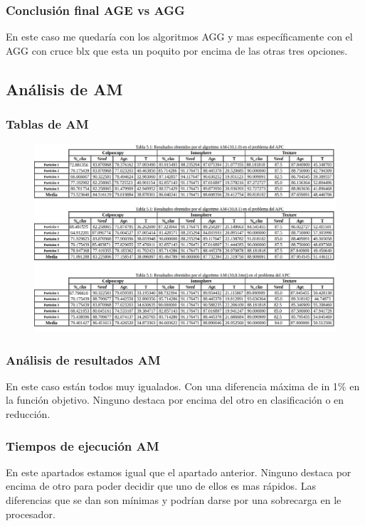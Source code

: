 \documentclass[titlepage]{article}
\begin{document}
	\subsubsection{Conclusión final AGE vs AGG}
	En este caso me quedaría con los algoritmos AGG y mas específicamente con el AGG	con cruce blx que esta un poquito por encima de las otras tres opciones.
	
	
	\subsection{Análisis de AM}
	\subsubsection{Tablas de AM}
	\begin{figure}[H]
		\centering
		\includegraphics[width=1\linewidth]{screenshot009}
		\caption{}
		\label{fig:screenshot009}
	\end{figure}
	\subsubsection{Análisis de resultados AM}
	En este caso están todos muy igualados. Con una diferencia máxima de in 1\% en la función objetivo. Ninguno destaca por encima del otro en clasificación o en reducción. 
	
	\subsubsection{Tiempos de ejecución AM}
	En este apartados estamos igual que el apartado anterior. Ninguno destaca por encima de otro para poder decidir que uno de ellos es mas rápidos. Las diferencias que se dan son mínimas y podrían darse por una sobrecarga en le procesador.
	
\end{document}
